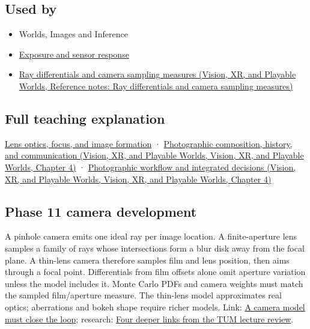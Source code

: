 \subsection{Used by}\label{appendix-21f8456e2629-used-by}

\begin{itemize}
\item
  {Worlds, Images and Inference}
\item
  \hyperref[appendix-92d45cdf2afc]{Exposure and sensor response}
\item
  \href{../07-Vision-XR-and-Playable-Worlds/main.pdf\#nameddest=appendix-8c40fad29462}{Ray differentials and camera sampling measures (Vision, XR, and Playable Worlds, Reference notes: Ray differentials and camera sampling measures)}
\end{itemize}

\subsection{Full teaching explanation}\label{appendix-21f8456e2629-full-teaching-explanation}

\hyperref[03-visual-computing-i-ch003-lens-optics-focus-and-image-formation]{Lens optics, focus, and image formation} · \href{../07-Vision-XR-and-Playable-Worlds/main.pdf\#nameddest=04-visual-computing-ii-ch034-photographic-composition-history-and-communication}{Photographic composition, history, and communication (Vision, XR, and Playable Worlds, Vision, XR, and Playable Worlds, Chapter 4)} · \href{../07-Vision-XR-and-Playable-Worlds/main.pdf\#nameddest=04-visual-computing-ii-ch034-photographic-workflow-and-integrated-decisions}{Photographic workflow and integrated decisions (Vision, XR, and Playable Worlds, Vision, XR, and Playable Worlds, Chapter 4)}

\subsection{Phase 11 camera development}\label{appendix-21f8456e2629-phase-11-camera-development}

A pinhole camera emits one ideal ray per image location. A finite-aperture lens samples a family of rays whose intersections form a blur disk away from the focal plane. A thin-lens camera therefore samples film and lens position, then aims through a focal point. Differentials from film offsets alone omit aperture variation unless the model includes it. Monte Carlo PDFs and camera weights must match the sampled film/aperture measure. The thin-lens model approximates real optics; aberrations and bokeh shape require richer models. Link: \hyperref[02-foundations-ii-ch037-a-camera-model-must-close-the-loop]{A camera model must close the loop}; research: \hyperref[02-foundations-ii-ch036-four-deeper-links-from-the-tum-lecture-review]{Four deeper links from the TUM lecture review}.
